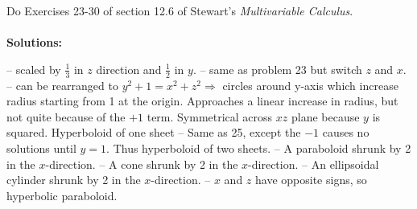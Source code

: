 \documentclass[12pt]{exam}
\begin{document}
\begin{questions}
\clearpage
\question Do Exercises 23-30 of section 12.6 of Stewart’s \textit{Multivariable Calculus}.
	\\\\\textbf{Solutions:}
	\begin{questions}
		\setcounter{question}{22}
		\question {} -- scaled by $\frac{1}{3}$ in $z$ direction and $\frac{1}{2}$ in $y$.
		\question {} -- same as problem 23 but switch $z$ and $x$.
		\question {} -- can be rearranged to $y^2+1=x^2+z^2 \Rightarrow$ circles around y-axis which increase radius starting from 1 at the origin. Approaches a linear increase in radius, but not quite because of the $+1$ term. Symmetrical across $xz$ plane because $y$ is squared. Hyperboloid of one sheet
		\question {} -- Same as 25, except the $-1$ causes no solutions until $y=1$. Thus hyperboloid of two sheets.
		\question {} -- A paraboloid shrunk by 2 in the $x$-direction.
		\question {} -- A cone shrunk by 2 in the $x$-direction.
		\question {} -- An ellipsoidal cylinder shrunk by 2 in the $x$-direction.
		\question {} -- $x$ and $z$ have opposite signs, so hyperbolic paraboloid.
	\end{questions}
\clearpage
\setcounter{question}{6}
\question
\end{questions}
\end{document}

